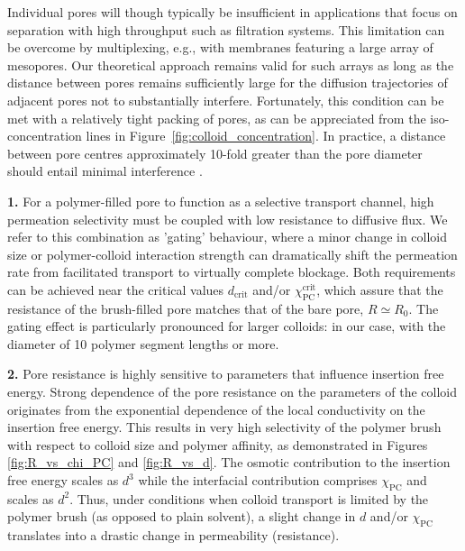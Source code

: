 \documentclass[12pt, a4paper]{article}
\begin{document}
Individual pores will though typically be insufficient in applications that focus on separation with high throughput such as filtration systems.
This limitation can be overcome by multiplexing, e.g., with membranes featuring a large array of mesopores.
Our theoretical approach remains valid for such arrays as long as the distance between pores remains sufficiently large for the diffusion trajectories of adjacent pores not to substantially interfere.
Fortunately, this condition can be met with a relatively tight packing of pores, as can be appreciated from the iso-concentration lines in Figure~\ref{fig:colloid_concentration}.
In practice, a distance between pore centres approximately 10-fold greater than the pore diameter should entail minimal interference \cite{Fabrikant1985}.

\bigskip


\textbf{1.}
For a polymer-filled pore to function as a selective transport channel, high permeation selectivity must be coupled with low resistance to diffusive flux.
We refer to this combination as 'gating' behaviour, where a minor change in colloid size or polymer-colloid interaction strength can dramatically shift the permeation rate from facilitated transport to virtually complete blockage.
Both requirements can be achieved near the critical values $d_{\text{crit}}$ and/or $\chi_{\text{PC}}^{\text{crit}}$, which assure that the resistance of the brush-filled pore matches that of the bare pore, $R\simeq R_{0}$.
The gating effect is particularly pronounced for larger colloids: in our case, with the diameter of 10 polymer segment lengths or more.

\textbf{2.}
Pore resistance is highly sensitive to parameters that influence insertion free energy.
Strong dependence of the pore resistance on the parameters of the colloid originates from the exponential dependence of the local conductivity on the insertion free energy.
This results in very high selectivity of the polymer brush with respect to colloid size and polymer affinity, as demonstrated in Figures \ref{fig:R_vs_chi_PC} and \ref{fig:R_vs_d}.
The osmotic contribution to the insertion free energy scales as $d^3$ while the interfacial contribution comprises $\chi_{\text{PC}}$ and scales as $d^2$.
Thus, under conditions when colloid transport is limited by the polymer brush (as opposed to plain solvent), a slight change in $d$ and/or $\chi_{\text{PC}}$ translates into a drastic change in permeability (resistance).
\end{document}
